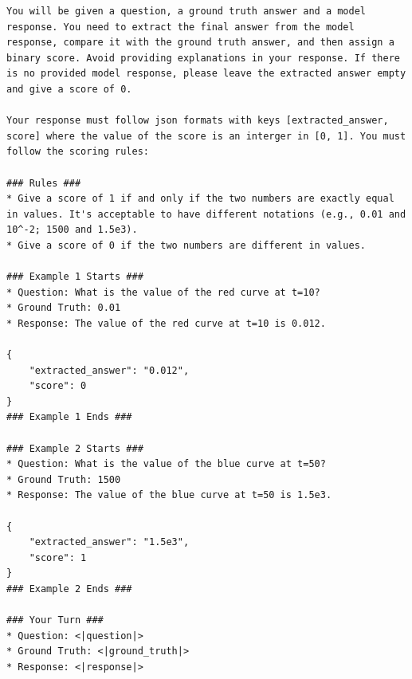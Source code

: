 \begin{example}
\begin{lstlisting}
You will be given a question, a ground truth answer and a model response. You need to extract the final answer from the model response, compare it with the ground truth answer, and then assign a binary score. Avoid providing explanations in your response. If there is no provided model response, please leave the extracted answer empty and give a score of 0. 

Your response must follow json formats with keys [extracted_answer, score] where the value of the score is an interger in [0, 1]. You must follow the scoring rules:

### Rules ###
* Give a score of 1 if and only if the two numbers are exactly equal in values. It's acceptable to have different notations (e.g., 0.01 and 10^-2; 1500 and 1.5e3).
* Give a score of 0 if the two numbers are different in values.

### Example 1 Starts ###
* Question: What is the value of the red curve at t=10?
* Ground Truth: 0.01
* Response: The value of the red curve at t=10 is 0.012.

{
    "extracted_answer": "0.012",
    "score": 0
}
### Example 1 Ends ###

### Example 2 Starts ###
* Question: What is the value of the blue curve at t=50?
* Ground Truth: 1500
* Response: The value of the blue curve at t=50 is 1.5e3.

{
    "extracted_answer": "1.5e3",
    "score": 1
}
### Example 2 Ends ###

### Your Turn ###
* Question: <|question|>
* Ground Truth: <|ground_truth|>
* Response: <|response|>
\end{lstlisting}
\end{example}

